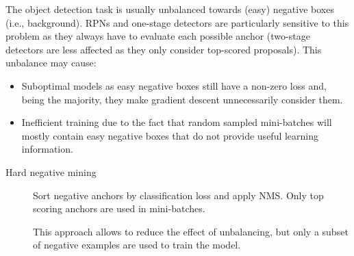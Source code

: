 \begin{remark}
    The object detection task is usually unbalanced towards (easy) negative boxes (i.e., background). RPNs and one-stage detectors are particularly sensitive to this problem as they always have to evaluate each possible anchor (two-stage detectors are less affected as they only consider top-scored proposals). This unbalance may cause:
    \begin{itemize}
        \item Suboptimal models as easy negative boxes still have a non-zero loss and, being the majority, they make gradient descent unnecessarily consider them.
        \item Inefficient training due to the fact that random sampled mini-batches will mostly contain easy negative boxes that do not provide useful learning information.
    \end{itemize}

    \begin{description}
        \item[Hard negative mining] 
            Sort negative anchors by classification loss and apply NMS. Only top scoring anchors are used in mini-batches. 
            \begin{remark}
                This approach allows to reduce the effect of unbalancing, but only a subset of negative examples are used to train the model.
            \end{remark}
    \end{description}
\end{remark}

